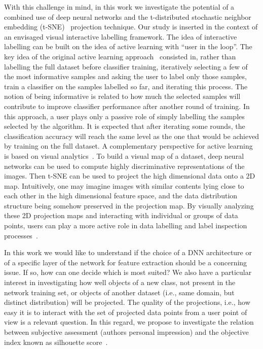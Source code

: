 \documentclass[sn-basic]{sn-jnl}%
\theoremstyle{thmstyleone}%
\theoremstyle{thmstyletwo}%
\theoremstyle{thmstylethree}%
\begin{document}
With this challenge in mind, in this work we investigate the potential of a combined use of deep neural networks and the t-distributed stochastic neighbor embedding (t-SNE)~\citep{tsne-paper} projection technique. Our study is inserted in the context of an envisaged visual interactive labelling framework. The idea of interactive labelling can be built on the idea of active learning with ``user in the loop''. The key idea of the original active learning approach~\citep{settles-book} consisted in, rather than labelling the full dataset before classifier training, iteratively selecting a few of the most informative samples and asking the user to label only those samples, train a classifier on the samples labelled so far, and iterating this process. The notion of being informative is related to how much the selected samples will contribute to improve classifier performance after another round of training. In this approach, a user plays only a passive role of simply labelling the samples selected by the algorithm. It is expected that after iterating some rounds, the classification accuracy will reach the same level as the one that would be achieved by training on the full dataset. A complementary perspective for active learning is based on visual analytics~\citep{wong-paper-va}. To build a visual map of a dataset, deep neural networks can be used to compute highly discriminative representations of the images. Then t-SNE can be used to project the high dimensional data onto a 2D map. Intuitively, one may imagine images with similar contents lying close to each other in the high dimensional feature space, and the data distribution structure being somehow preserved in the projection map. By visually analyzing these 2D projection maps and interacting with individual or groups of data points, users can play a more active role in data labelling and label inspection processes~\citep{bernard-paper-vial}.

In this work we would like to understand if the choice of a DNN architecture or of a specific layer of the network for feature extraction should be a concerning issue. If so, how can one decide which is most suited? We also have a particular interest in investigating how well objects of a new class, not present in the network training set, or objects of another dataset (i.e., same domain, but distinct distribution) will be projected. The quality of the projections, i.e., how easy it is to interact with the set of projected data points from a user point of view is a relevant question. In this regard, we propose to investigate the relation between subjective assessment (authors personal impression) and the objective index known as silhouette score~\citep{rousseeuw-silhouette}.
\end{document}
